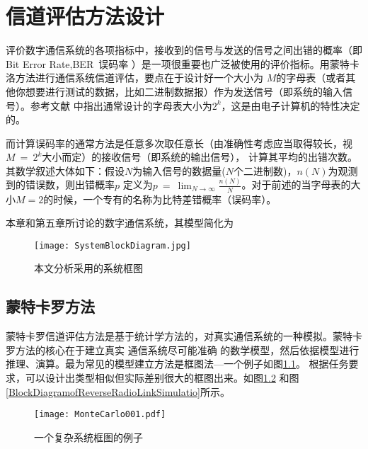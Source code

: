 \chapter{信道评估方法设计}
评价数字通信系统的各项指标中，接收到的信号与发送的信号之间出错的概率（即Bit Error Rate,BER~误码率 ）是一项很重要也广泛被使用的评价指标。用蒙特卡洛方法进行通信系统信道评估，要点在于设计好一个大小为
$M$的字母表（或者其他你想要进行测试的数据，比如二进制数据报）作为发送信号（即系统的输入信号）。参考文献
中指出通常设计的字母表大小为$2^{k}$，这是由电子计算机的特性决定的。
\par 而计算误码率的通常方法是任意多次取任意长（由准确性考虑应当取得较长，视$M~=~2^{k}$大小而定）的接收信号（即系统的输出信号），
计算其平均的出错次数。其数学叙述大体如下：假设$N$为输入信号的数据量($N$个二进制数)，$n(N)$为观测到的错误数，则出错概率$p$
定义为$p ~=~ \displaystyle{\lim_{N\rightarrow\infty}}\frac{n(N)}{N}$。对于前述的当字母表的大小$M=2$的时候，一个专有的名称为比特差错概率（误码率）。
\par
本章和第五章所讨论的数字通信系统，其模型简化为
\begin{figure}[htbp]%
  \centering
  \texttt{[image: SystemBlockDiagram.jpg]}\\
  \caption{本文分析采用的系统框图} \label{CommunicationSystemBlockDiagram}
\end{figure}


\section{蒙特卡罗方法}
蒙特卡罗信道评估方法是基于统计学方法的，对真实通信系统的一种模拟。蒙特卡罗方法的核心在于建立真实 通信系统尽可能准确
的数学模型，然后依据模型进行推理、演算。最为常见的模型建立方法是框图法---一个例子如图\ref{CommunicationSystemBlockDiagram}。
根据任务要求，可以设计出类型相似但实际差别很大的框图出来。如图\ref{EvolutionofMonteCarloSimulation}
和图\ref{BlockDiagramofReverseRadioLinkSimulatio}所示。
\begin{figure}
[htbp]
\centering
\texttt{[image: MonteCarlo001.pdf]}
\caption{一个复杂系统框图的例子}\label{EvolutionofMonteCarloSimulation}
\end{figure}

